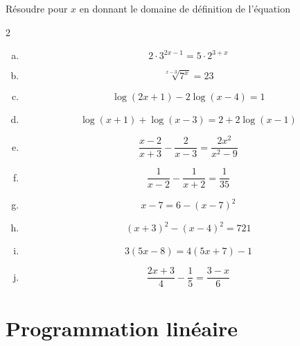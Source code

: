 \documentclass[twoside, a4paper, 12pt, openright, fullpage]{book}
\begin{document}
\begin{exercice}\label{exercice1}
Résoudre pour $x$ en donnant le domaine de définition de l'équation
\begin{multicols}{2}
\begin{enumerate}[a)]
\item
$$
2\cdot 3^{2x-1}  =  5 \cdot 2^{3+x}
$$
\item
$$
\sqrt[x-3]{7^x}  =  23
$$
\item
$$
\log(2x+1) - 2\log(x-4) = 1
$$
\item
$$
\log(x+1)+\log(x-3) = 2 + 2\log(x-1)
$$
\item
$$
\frac{x-2}{x+3} - \frac{2}{x-3} = \frac{2x^2}{x^2-9}
$$
\item
$$
\frac{1}{x-2} - \frac{1}{x+2} = \frac{1}{35}
$$
\item
$$
x-7 = 6-(x-7)^2
$$
\item 
$$
(x+3)^2 - (x-4)^2 = 721
$$
\item 
$$
3(5x-8) = 4(5x+7)-1
$$
\item 
$$
\frac{2x+3}{4} - \frac{1}{5} = \frac{3-x}{6}
$$ 
\end{enumerate}
\end{multicols}
\end{exercice}

\section{Programmation linéaire}
\end{document}
